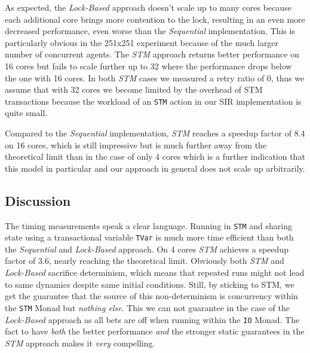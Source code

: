 As expected, the \textit{Lock-Based} approach doesn't scale up to many cores because each additional core brings more contention to the lock, resulting in an even more decreased performance, even worse than the \textit{Sequential} implementation. This is particularly obvious in the 251x251 experiment because of the much larger number of concurrent agents. The \textit{STM} approach returns better performance on 16 cores but fails to scale further up to 32 where the performance drops below the one with 16 cores. In both \textit{STM} cases we measured a retry ratio of 0, thus we assume that with 32 cores we become limited by the overhead of STM transactions \cite{perfumo_limits_2008} because the workload of an \texttt{STM} action in our SIR implementation is quite small.

Compared to the \textit{Sequential} implementation, \textit{STM} reaches a speedup factor of 8.4 on 16 cores, which is still impressive but is much further away from the theoretical limit than in the case of only 4 cores which is a further indication that this model in particular and our approach in general does not scale up arbitrarily.

%

\subsection{Discussion}
The timing measurements speak a clear language. Running in \texttt{STM} and sharing state using a transactional variable \texttt{TVar} is much more time efficient than both the \textit{Sequential} and \textit{Lock-Based} approach. On 4 cores \textit{STM} achieves a speedup factor of 3.6, nearly reaching the theoretical limit.
Obviously both \textit{STM} and \textit{Lock-Based} sacrifice determinism, which means that repeated runs might not lead to same dynamics despite same initial conditions. Still, by sticking to STM, we get the guarantee that the source of this non-determinism is concurrency within the \texttt{STM} Monad but \textit{nothing else}. This we can not guarantee in the case of the \textit{Lock-Based} approach as all bets are off when running within the \texttt{IO} Monad. The fact to have \textit{both} the better performance \textit{and} the stronger static guarantees in the \textit{STM} approach makes it \textit{very} compelling.